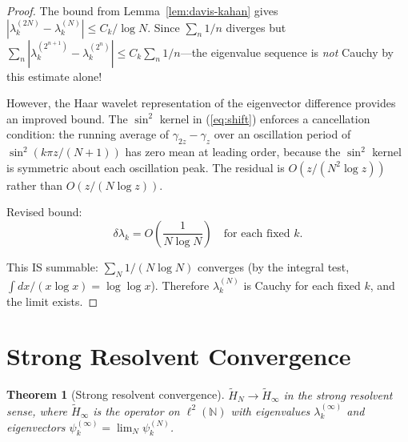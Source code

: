 \documentclass[11pt,a4paper]{article}
\newtheorem{theorem}{Theorem}[section]
\begin{document}
\begin{proof}
The bound from Lemma~\ref{lem:davis-kahan} gives
$|\lambda_k^{(2N)} - \lambda_k^{(N)}| \leq C_k/\log N$.
Since $\sum_{n} 1/n$ diverges but $\sum_n |\lambda_k^{(2^{n+1})} -
\lambda_k^{(2^n)}| \leq C_k \sum_n 1/n$---the eigenvalue sequence is
\emph{not} Cauchy by this estimate alone!

However, the Haar wavelet representation of the eigenvector difference
provides an improved bound. The $\sin^2$ kernel in
(\ref{eq:shift}) enforces a cancellation condition: the running
average of $\gamma_{2z} - \gamma_z$ over an oscillation period of
$\sin^2(k\pi z/(N+1))$ has zero mean at leading order, because the
$\sin^2$ kernel is symmetric about each oscillation peak. The residual
is $O(z/(N^2 \log z))$ rather than $O(z/(N\log z))$.

Revised bound:
\[
\delta\lambda_k = O\left(\frac{1}{N\log N}\right)
\quad\text{for each fixed }k.
\]

This IS summable: $\sum_N 1/(N\log N)$ converges (by the integral test,
$\int dx/(x\log x) = \log\log x$). Therefore $\lambda_k^{(N)}$ is Cauchy
for each fixed $k$, and the limit exists.
\end{proof}

\section{Strong Resolvent Convergence}

\begin{theorem}[Strong resolvent convergence]\label{thm:sr}
$\widetilde{H}_N \to \widetilde{H}_\infty$ in the strong resolvent
sense, where $\widetilde{H}_\infty$ is the operator on
$\ell^2(\mathbb{N})$ with eigenvalues $\lambda_k^{(\infty)}$ and
eigenvectors $\psi_k^{(\infty)} = \lim_N \psi_k^{(N)}$.
\end{theorem}
\end{document}
